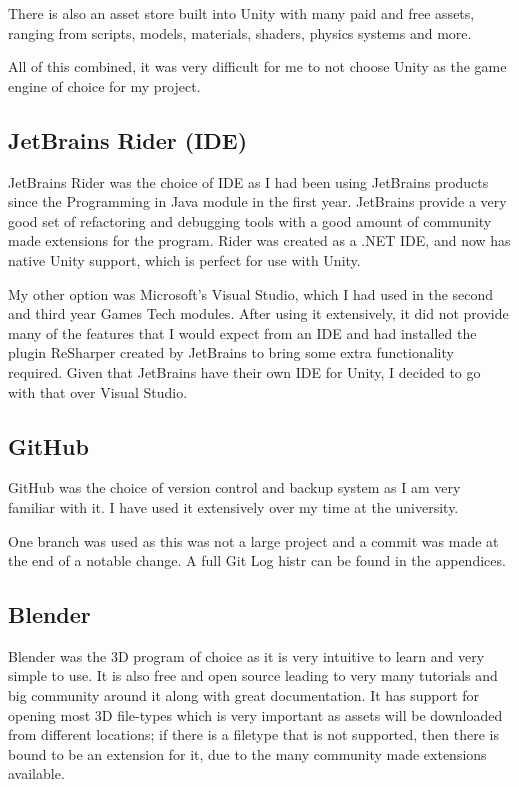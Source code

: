 \documentclass[11pt]{report}
\begin{document}
There is also an asset store built into Unity with many paid and free assets, ranging from scripts, models, materials, shaders, physics systems and more.

All of this combined, it was very difficult for me to not choose Unity as the game engine of choice for my project.

\subsection{JetBrains Rider (IDE)}
JetBrains Rider was the choice of IDE as I had been using JetBrains products since the Programming in Java module in the first year. JetBrains provide a very good set of refactoring and debugging tools with a good amount of community made extensions for the program. Rider was created as a .NET IDE, and now has native Unity support, which is perfect for use with Unity.

My other option was Microsoft's Visual Studio, which I had used in the second and third year Games Tech modules. After using it extensively, it did not provide many of the features that I would expect from an IDE and had installed the plugin ReSharper created by JetBrains to bring some extra functionality required. Given that JetBrains have their own IDE for Unity, I decided to go with that over Visual Studio.

\subsection{GitHub}
GitHub was the choice of version control and backup system as I am very familiar with it. I have used it extensively over my time at the university.

One branch was used as this was not a large project and a commit was made at the end of a notable change. A full Git Log histr can be found in the appendices.

\subsection{Blender}
Blender was the 3D program of choice as it is very intuitive to learn and very simple to use. It is also free and open source leading to very many tutorials and big community around it along with great documentation. It has support for opening most 3D file-types which is very important as assets will be downloaded from different locations; if there is a filetype that is not supported, then there is bound to be an extension for it, due to the many community made extensions available.
\end{document}
